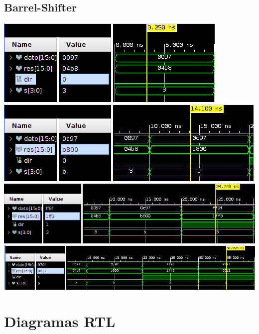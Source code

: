 \documentclass[8pt,executivepaper]{article}
\begin{document}
\subsection{Barrel-Shifter}
\begin{center}
  \includegraphics[scale=0.5]{imgs/unoBarrel.png}\\
  \includegraphics[scale=0.5]{imgs/dosBarrel.png}\\
  \includegraphics[scale=0.5]{imgs/tresBarrel.png}\\
  \includegraphics[scale=0.5]{imgs/cuatroBarrel.png}\\
\end{center}
\clearpage
\section{Diagramas RTL}
\end{document}
